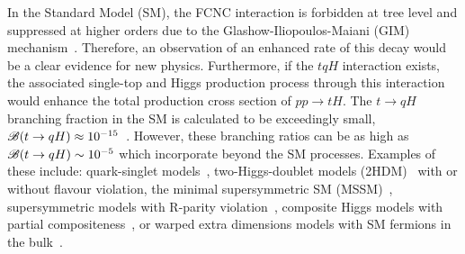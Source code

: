 In the Standard Model (SM), the FCNC interaction is forbidden at tree level and suppressed at higher orders due to the Glashow-Iliopoulos-Maiani (GIM) mechanism~\cite{Glashow:1970gm}. Therefore, an observation of an enhanced rate of this decay would be a clear evidence for new physics.
Furthermore, if the $tqH$ interaction exists, the associated single-top and  Higgs  production process through this interaction would enhance
the total production cross section of $pp\rightarrow tH$.
The $t\to qH$ branching fraction in the SM is calculated to be exceedingly small, $\mathscr{B}(t\to qH)\approx10^{-15}$~\cite{Eilam:1990zc,Mele:1998ag,AguilarSaavedra:2004wm,Zhang:2013xya}. 
However, these branching ratios can be as high as $\mathscr{B}(t\to qH) \sim 10^{-5}$ which incorporate beyond the SM processes. Examples of these include: quark-singlet models~\cite{AguilarSaavedra:2002kr}, two-Higgs-doublet models (2HDM)~\cite{ Branco:2hdm2012} with or without flavour violation,
the minimal supersymmetric SM (MSSM)~\cite{Bejar:2000ub, Guasch:1999jp,Cao:2007dk,Cao:2014udj},
supersymmetric models with R-parity violation~\cite{Eilam:2001dh}, composite Higgs models with partial  compositeness~\cite{Azatov:2014lha}, 
or warped extra dimensions models with SM fermions in the bulk~\cite{Azatov:2009na}. 
